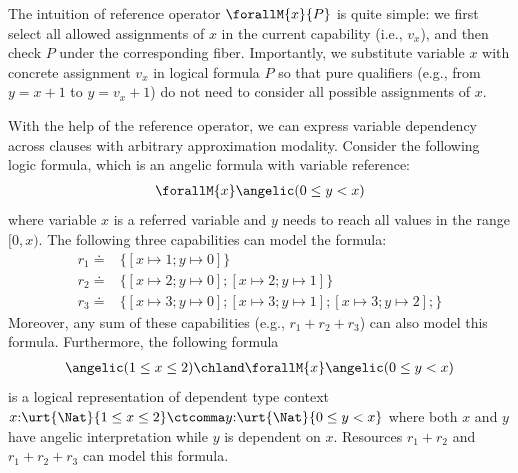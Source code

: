 The intuition of reference operator $\forallM{x}{P}$ is quite simple: we first select all allowed assignments of $x$ in the current capability (i.e., $v_x$), and then check $P$ under the corresponding fiber. Importantly, we substitute variable $x$ with concrete assignment $v_x$ in logical formula $P$ so that pure qualifiers (e.g., from $y = x + 1$ to $y = v_x + 1$) do not need to consider all possible assignments of $x$.

\begin{example} With the help of the reference operator, we can express variable dependency across clauses with arbitrary approximation modality. Consider the following logic formula, which is an angelic formula with variable reference:
\begin{align*}
  \forallM{x} \angelic (0 \leq y < x) 
\end{align*}\noindent
where variable $x$ is a referred variable and $y$ needs to reach all values in the range $[0, x)$. The following three capabilities can model the formula:
  \begin{align*}
    r_1 \doteq &\{[x \mapsto 1; y \mapsto 0]\}\\
    r_2 \doteq &\{[x \mapsto 2; y \mapsto 0]; [x \mapsto 2; y \mapsto 1] \}\\
    r_3 \doteq &\{[x \mapsto 3; y \mapsto 0]; [x \mapsto 3; y \mapsto 1]; [x \mapsto 3; y \mapsto 2]; \}
  \end{align*}
Moreover, any sum of these capabilities (e.g., $r_1 + r_2 + r_3$) can also model this formula. Furthermore, the following formula
\begin{align*}
  \angelic (1 \leq x \leq 2) \chland \forallM{x} \angelic (0 \leq y < x) 
\end{align*}\noindent
is a logical representation of dependent type context $x{:}\urt{\Nat}{1 \leq x \leq 2} \ctcomma y{:}\urt{\Nat}{0 \leq y < x}$ where both $x$ and $y$ have angelic interpretation while $y$ is dependent on $x$. Resources $r_1 + r_2$ and $r_1 + r_2 + r_3$ can model this formula.
\end{example}


